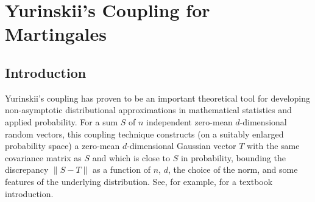 \chapter{Yurinskii's Coupling for Martingales}

\section{Introduction}

Yurinskii's coupling \citep{yurinskii1978error} has proven to be an important
theoretical tool for developing non-asymptotic distributional approximations in
mathematical statistics and applied probability. For a sum $S$ of $n$
independent zero-mean $d$-dimensional random vectors, this coupling technique
constructs (on a suitably enlarged probability space)
a zero-mean $d$-dimensional
Gaussian vector $T$ with the same covariance matrix as $S$ and which is close
to $S$ in probability, bounding the discrepancy $\|S-T\|$ as a function of $n$,
$d$, the choice of the norm, and some features of the underlying distribution.
See, for example, \citet[Chapter 10]{pollard2002user} for a textbook
introduction.

